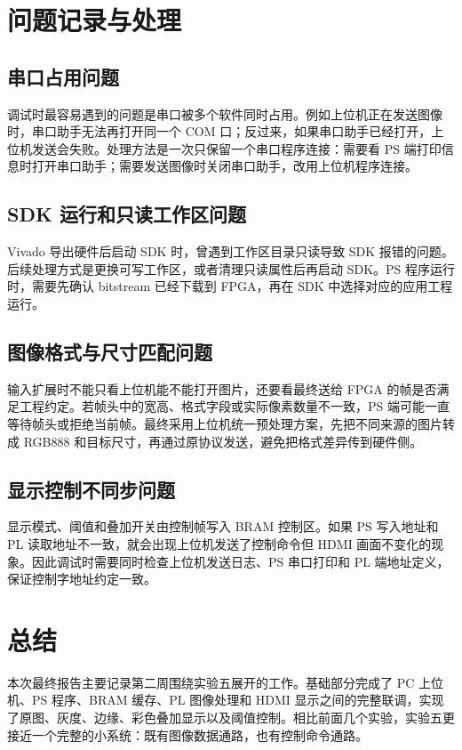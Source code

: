 \documentclass[12pt,a4paper]{ctexart}
\begin{document}
\section{问题记录与处理}

\subsection{串口占用问题}

调试时最容易遇到的问题是串口被多个软件同时占用。例如上位机正在发送图像时，串口助手无法再打开同一个 COM 口；反过来，如果串口助手已经打开，上位机发送会失败。处理方法是一次只保留一个串口程序连接：需要看 PS 端打印信息时打开串口助手；需要发送图像时关闭串口助手，改用上位机程序连接。

\subsection{SDK 运行和只读工作区问题}

Vivado 导出硬件后启动 SDK 时，曾遇到工作区目录只读导致 SDK 报错的问题。后续处理方式是更换可写工作区，或者清理只读属性后再启动 SDK。PS 程序运行时，需要先确认 bitstream 已经下载到 FPGA，再在 SDK 中选择对应的应用工程运行。

\subsection{图像格式与尺寸匹配问题}

输入扩展时不能只看上位机能不能打开图片，还要看最终送给 FPGA 的帧是否满足工程约定。若帧头中的宽高、格式字段或实际像素数量不一致，PS 端可能一直等待帧头或拒绝当前帧。最终采用上位机统一预处理方案，先把不同来源的图片转成 RGB888 和目标尺寸，再通过原协议发送，避免把格式差异传到硬件侧。

\subsection{显示控制不同步问题}

显示模式、阈值和叠加开关由控制帧写入 BRAM 控制区。如果 PS 写入地址和 PL 读取地址不一致，就会出现上位机发送了控制命令但 HDMI 画面不变化的现象。因此调试时需要同时检查上位机发送日志、PS 串口打印和 PL 端地址定义，保证控制字地址约定一致。

\section{总结}

本次最终报告主要记录第二周围绕实验五展开的工作。基础部分完成了 PC 上位机、PS 程序、BRAM 缓存、PL 图像处理和 HDMI 显示之间的完整联调，实现了原图、灰度、边缘、彩色叠加显示以及阈值控制。相比前面几个实验，实验五更接近一个完整的小系统：既有图像数据通路，也有控制命令通路。
\end{document}
